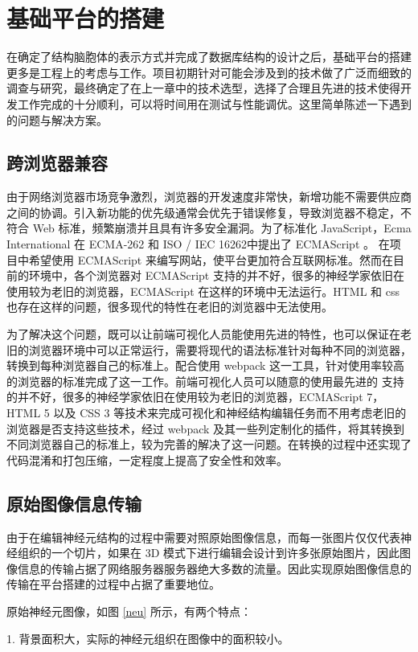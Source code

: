 \section{基础平台的搭建}
在确定了结构脑胞体的表示方式并完成了数据库结构的设计之后，基础平台的搭建更多是工程上的考虑与工作。项目初期针对可能会涉及到的技术做了广泛而细致的调查与研究，最终确定了在上一章中的技术选型，选择了合理且先进的技术使得开发工作完成的十分顺利，可以将时间用在测试与性能调优。这里简单陈述一下遇到的问题与解决方案。

\subsection{跨浏览器兼容}
由于网络浏览器市场竞争激烈，浏览器的开发速度非常快，新增功能不需要供应商之间的协调。引入新功能的优先级通常会优先于错误修复，导致浏览器不稳定，不符合 Web 标准，频繁崩溃并且具有许多安全漏洞。为了标准化 JavaScript，Ecma International 在 ECMA-262 和 ISO / IEC 16262中提出了 ECMAScript 。 在项目中希望使用 ECMAScript 来编写网站，使平台更加符合互联网标准。然而在目前的环境中，各个浏览器对 ECMAScript 支持的并不好，很多的神经学家依旧在使用较为老旧的浏览器，ECMAScript 在这样的环境中无法运行。HTML 和 css 也存在这样的问题，很多现代的特性在老旧的浏览器中无法使用。

为了解决这个问题，既可以让前端可视化人员能使用先进的特性，也可以保证在老旧的浏览器环境中可以正常运行，需要将现代的语法标准针对每种不同的浏览器，转换到每种浏览器自己的标准上。配合使用 webpack 这一工具，针对使用率较高的浏览器的标准完成了这一工作。前端可视化人员可以随意的使用最先进的 支持的并不好，很多的神经学家依旧在使用较为老旧的浏览器，ECMAScript 7，HTML 5 以及 CSS 3 等技术来完成可视化和神经结构编辑任务而不用考虑老旧的浏览器是否支持这些技术，经过 webpack 及其一些列定制化的插件，将其转换到不同浏览器自己的标准上，较为完善的解决了这一问题。在转换的过程中还实现了代码混淆和打包压缩，一定程度上提高了安全性和效率。

\subsection{原始图像信息传输}
由于在编辑神经元结构的过程中需要对照原始图像信息，而每一张图片仅仅代表神经组织的一个切片，如果在 3D 模式下进行编辑会设计到许多张原始图片，因此图像信息的传输占据了网络服务器服务器绝大多数的流量。因此实现原始图像信息的传输在平台搭建的过程中占据了重要地位。

原始神经元图像，如图 \ref{neu} 所示，有两个特点：

1. 背景面积大，实际的神经元组织在图像中的面积较小。

